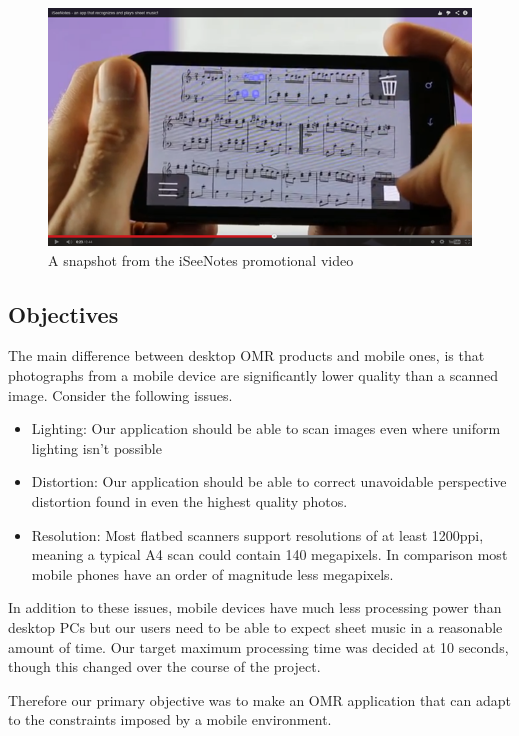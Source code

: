 \begin{figure}[ht!]
    \centering
    \includegraphics[width=120mm]{./assets/iseenotes.png}
    \caption{A snapshot from the iSeeNotes promotional video\cite{iSeeNotes}}
    \label{iseenotes}
\end{figure}

\subsection{Objectives}
The main difference between desktop OMR products and mobile ones, is that photographs from a mobile device are significantly lower quality than a scanned image. Consider the following issues.

\begin{itemize}
  \item Lighting: Our application should be able to scan images even where uniform lighting isn't possible
  \item Distortion: Our application should be able to correct unavoidable perspective distortion found in even the highest quality photos.
  \item Resolution: Most flatbed scanners support resolutions of at least 1200ppi, meaning a typical A4 scan could contain 140 megapixels. In comparison most mobile phones have an order of magnitude less megapixels.
\end{itemize}

In addition to these issues, mobile devices have much less processing power than desktop PCs but our users need to be able to expect sheet music in a reasonable amount of time. Our target maximum processing time was decided at 10 seconds, though this changed over the course of the project. 

Therefore our primary objective was to make an OMR application that can adapt to the constraints imposed by a mobile environment.

